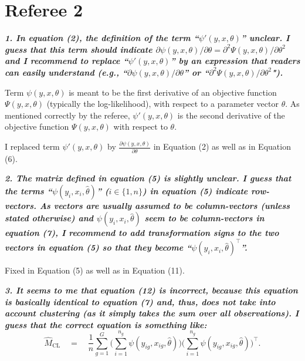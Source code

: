 \documentclass[10pt,a4paper]{article}
\begin{document}
\section*{Referee 2}

\textbf{\textit{1. In equation (2), the definition of the term ``$\psi'(y, x, \theta)$'' unclear.
I guess that this term should indicate $\partial \psi(y, x, \theta)/\partial\theta = \partial^2\Psi(y, x, \theta)/\partial\theta^2$ and I recommend to replace ``$\psi'(y, x, \theta)$''
by an expression that readers can easily understand
(e.g., ``$\partial \psi(y, x, \theta)/\partial\theta$'' or ``$\partial^2\Psi(y, x, \theta)/\partial\theta^2$").}}

\medskip

Term $\psi(y, x, \theta)$ is meant to be the first derivative of an objective function $\Psi(y, x, \theta)$ (typically the log-likelihood), with respect to a parameter vector $\theta$. As mentioned correctly by the referee, $\psi'(y, x, \theta)$ is the second derivative of the objective function $\Psi(y, x, \theta)$ with respect to $\theta$.

I replaced term $\psi'(y, x, \theta)$ by $\frac{\partial \psi(y, x, \theta)}{\partial\theta}$ in Equation (2) as well as in Equation (6).

\medskip

\textbf{\textit{2. The matrix defined in equation (5) is slightly unclear. I guess that the terms ``$\psi(y_i, x_i, \hat\theta)$'' ($i \in \{1, n\}$) in equation (5) indicate row-vectors. As vectors are usually assumed to be column-vectors (unless stated otherwise) and $\psi(y_i, x_i, \hat\theta)$ seem to be column-vectors in
equation (7), I recommend to add transformation signs to the two vectors in equation (5)
so that they become ``$\psi(y_i, x_i, \hat\theta)^\top$''.}}

\medskip

Fixed in Equation (5) as well as in Equation (11).

\medskip

\textbf{\textit{3. It seems to me that equation (12) is incorrect, because this equation is basically identical
to equation (7) and, thus, does not take into account clustering (as it simply takes the
sum over all observations). I guess that the correct equation is something like:
\begin{equation}
  \hat M_\mathrm{CL} \quad = \quad \frac{1}{n} \sum_{g = 1}^G\bigg(\sum_{i = 1}^{n_{g}}\psi(y_{ig}, x_{ig}, \hat \theta) \bigg) \bigg(\sum_{i = 1}^{n_{g}} \psi(y_{ig}, x_{ig}, \hat \theta) \bigg)^\top.
\end{equation}}}
\end{document}
